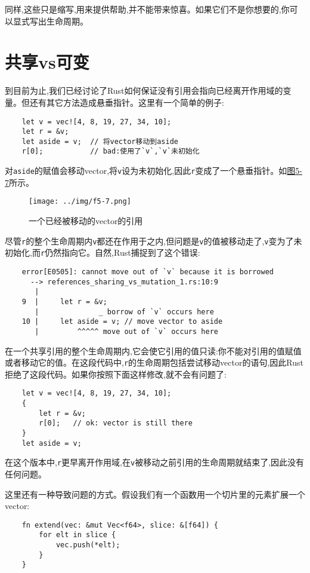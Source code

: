 同样,这些只是缩写,用来提供帮助,并不能带来惊喜。如果它们不是你想要的,你可以显式写出生命周期。

\section{共享vs可变}\label{ShareVSMut}

到目前为止,我们已经讨论了Rust如何保证没有引用会指向已经离开作用域的变量。但还有其它方法造成悬垂指针。这里有一个简单的例子:
\begin{verbatim}
    let v = vec![4, 8, 19, 27, 34, 10];
    let r = &v;
    let aside = v;  // 将vector移动到aside
    r[0];           // bad:使用了`v`,`v`未初始化
\end{verbatim}

对\texttt{aside}的赋值会移动vector,将\texttt{v}设为未初始化,因此\texttt{r}变成了一个悬垂指针。如\hyperref[f5-7]{图5-7}所示。

\begin{figure}[htbp]
    \centering
    \texttt{[image: ../img/f5-7.png]}
    \caption{一个已经被移动的vector的引用}
    \label{f5-7}
\end{figure}

尽管\texttt{r}的整个生命周期内\texttt{v}都还在作用于之内,但问题是\texttt{v}的值被移动走了,\texttt{v}变为了未初始化,而\texttt{r}仍然指向它。自然,Rust捕捉到了这个错误:
\begin{verbatim}
    error[E0505]: cannot move out of `v` because it is borrowed
      --> references_sharing_vs_mutation_1.rs:10:9
       |
    9  |     let r = &v;
       |              _ borrow of `v` occurs here
    10 |     let aside = v; // move vector to aside
       |         ^^^^^ move out of `v` occurs here
\end{verbatim}

在一个共享引用的整个生命周期内,它会使它引用的值只读:你不能对引用的值赋值或者移动它的值。在这段代码中,\texttt{r}的生命周期包括尝试移动vector的语句,因此Rust拒绝了这段代码。如果你按照下面这样修改,就不会有问题了:
\begin{verbatim}
    let v = vec![4, 8, 19, 27, 34, 10];
    {
        let r = &v;
        r[0];   // ok: vector is still there
    }
    let aside = v;
\end{verbatim}

在这个版本中,\texttt{r}更早离开作用域,在\texttt{v}被移动之前引用的生命周期就结束了,因此没有任何问题。

这里还有一种导致问题的方式。假设我们有一个函数用一个切片里的元素扩展一个vector:
\begin{verbatim}
    fn extend(vec: &mut Vec<f64>, slice: &[f64]) {
        for elt in slice {
            vec.push(*elt);
        }
    }
\end{verbatim}

